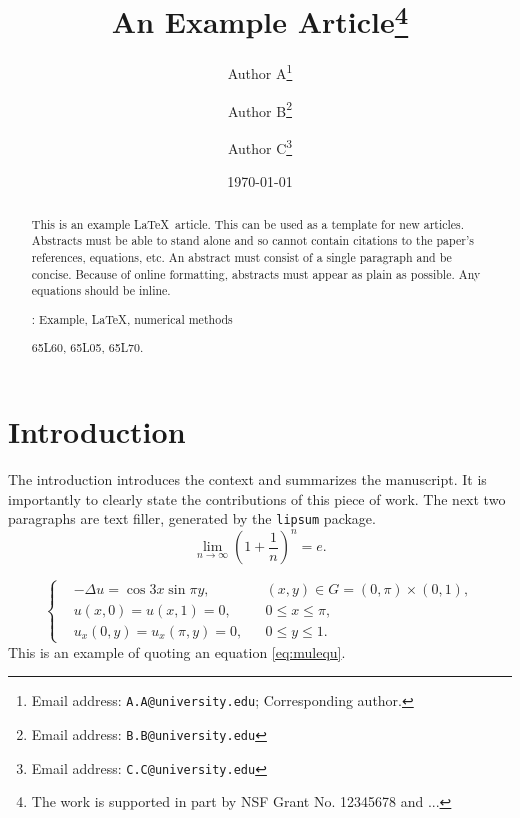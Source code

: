 \documentclass[10pt,reqno,final]{article}
\title{An Example Article\thanks{The work is supported in part by NSF Grant No. 12345678 and ...}}
\author{Author A\thanks{Email address: \texttt{A.A@university.edu}; Corresponding author.}}
\affil{Department of Computer Science, \LaTeX\ University.}
\author{Author B\thanks{Email address: \texttt{B.B@university.edu}}}
\affil{Department of Mathematics, \LaTeX\ University.}
\author{Author C\thanks{Email address: \texttt{C.C@university.edu}}}
\affil{Department of Mechanical Engineering, \LaTeX\ University}
\date{\today}
\theoremstyle{plain}
\theoremstyle{definition}
\theoremstyle{remark}
\begin{document}
\maketitle

\begin{abstract}
  This is an example \LaTeX\ article. This can be used as a
  template for new articles.  Abstracts must be able to stand alone
  and so cannot contain citations to the paper's references,
  equations, etc.  An abstract must consist of a single paragraph and
  be concise. Because of online formatting, abstracts must appear as
  plain as possible. Any equations should be inline.

  \medskip
  : Example, \LaTeX, numerical methods

  \medskip
   65L60, 65L05, 65L70.
\end{abstract}


\section{Introduction}
The introduction introduces the context and summarizes the
manuscript. It is importantly to clearly state the contributions of
this piece of work. The next two paragraphs are text filler,
generated by the \texttt{lipsum} package.
\begin{equation}\label{eq:limite}
  \lim_{n\to\infty}\left(1+\frac{1}{n}\right)^n=e.
\end{equation}

\lipsum[2]

\begin{equation}\label{eq:mulequ}
\left\{\begin{aligned}
&-\Delta u=\cos 3x \sin \pi y, && (x, y) \in G=(0, \pi) \times(0,1), \\
&u(x, 0)=u(x, 1)=0, && 0 \leqslant x \leqslant \pi, \\
&u_{x}(0, y)=u_{x}(\pi, y)=0, && 0 \leqslant y \leqslant 1.
\end{aligned}\right.
\end{equation}
This is an example of quoting an equation \eqref{eq:mulequ}.

\end{document}
